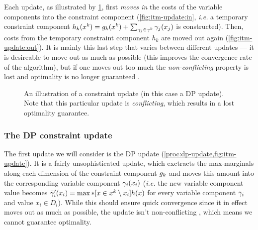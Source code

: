 Each update, as illustrated by \cref{fig:itm-update}, first \emph{moves in} the costs of the variable components into the constraint component (\cref{fig:itm-update:in}, \emph{i.e.} a temporary constraint component \(h_k(x^k) = g_k(x^k) + \sum_{\gamma_j \in \gamma^k} \gamma_j(x_j)\) is constructed).
Then, costs from the temporary constraint component \(h_k\) are moved out again (\cref{fig:itm-update:out}).
It is mainly this last step that varies between different updates --- it is desireable to move out as much as possible (this improves the convergence rate of the algorithm), but if one moves out too much the \emph{non-conflicting} property is lost and optimality is no longer guaranteed \parencites[\pno~105]{Wedelin08}[\pno~15]{Wedelin13}.

\begin{figure}[tbp]
	\centering
	\hfil
	\hfil
	\caption{An illustration of a constraint update (in this case a DP update). Note that this particular update is \emph{conflicting}, which results in a lost optimality guarantee.}
	\label{fig:itm-update}
\end{figure}

\subsubsection{The DP constraint update}
The first update we will consider is the DP update (\cref{proc:dp-update,fig:itm-update}).
It is a fairly unsophisticated update, which exctracts the max-marginals along each dimension of the constraint component \(g_k\) and moves this amount into the corresponding variable component \(\gamma_i(x_i)\) (\emph{i.e.} the new variable component value becomes \(\bar{\gamma}'_i(x_i) = \max*[x\in x^k\setminus x_i]{h(x)}\) for every variable component \(\gamma_i\) and value \(x_i\in D_i\)).
While this should ensure quick convergence since it in effect moves out as much as possible, the update isn't non-conflicting \parencite[\pno~105]{Wedelin08}, which means we cannot guarantee optimality.

